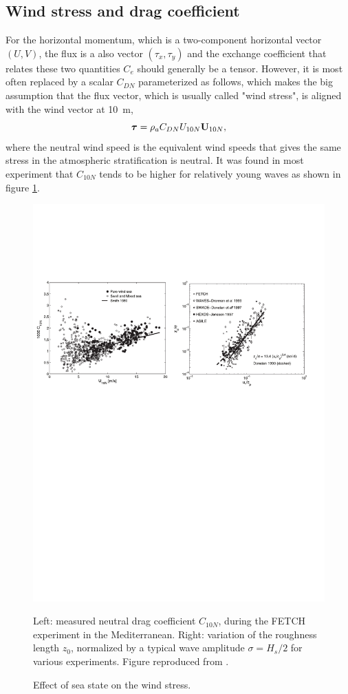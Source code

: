 \subsection{Wind stress and drag coefficient}
For the horizontal momentum, which is a two-component horizontal vector $(U,V)$, the flux is a also vector $(\tau_x,\tau_y)$ and the exchange coefficient that relates these two quantities $C_e$ should generally be a tensor. However, it is most often replaced by a scalar $C_{DN}$ parameterized as follows, which makes the big assumption that the flux vector, which is usually called "wind stress", is aligned with the wind vector at 10~m,  
\begin{equation}
 {\bm{\tau}}=\rho_a C_{DN} U_{10N} \mathbf{U}_{10N},
\end{equation}
where the neutral wind speed is the equivalent wind speeds that gives the same stress in the atmospheric stratification is neutral. It was found in most experiment that $C_{10N}$ tends to be higher for relatively young waves as shown in figure \ref{Drennanetal2003}.
\begin{figure}
\centerline{\includegraphics[width=\textwidth]{FIGS_CH_AIRSEA/Drennan_etal_JGR2003.pdf}}
  \caption{Effect of sea state on the wind stress.}{Left: measured neutral drag coefficient  $C_{10N}$, 
  during the  FETCH experiment in the Mediterranean. Right: variation of the roughness length  $z_0$, normalized by a typical wave amplitude $\sigma=H_s/2$ for various experiments. Figure reproduced from \cite{Drennan&al.2003}.}
\label{Drennanetal2003}
\end{figure}
